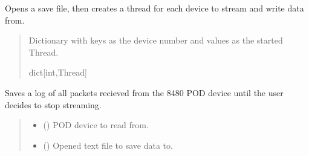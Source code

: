 \documentclass[letterpaper,10pt,english]{sphinxmanual}
\begin{document}
\begin{fulllineitems}
\begin{fulllineitems}
\label{\detokenize{Setup.SetupOneDevice:Setup.SetupOneDevice.Setup_8480SC.Setup8480SC._StreamThreading}}
\pysigstartsignatures
{}
\pysigstopsignatures
\sphinxAtStartPar
Opens a save file, then creates a thread for each device to stream and write         data from.
\begin{quote}\begin{description}
\sphinxAtStartPar
Dictionary with keys as the device number and values as the                 started Thread.

\sphinxAtStartPar
dict{[}int,Thread{]}

\end{description}\end{quote}

\end{fulllineitems}


\begin{fulllineitems}
\label{\detokenize{Setup.SetupOneDevice:Setup.SetupOneDevice.Setup_8480SC.Setup8480SC._StreamUntilStop}}
\pysigstartsignatures
{}
\pysigstopsignatures
\sphinxAtStartPar
Saves a log of all packets recieved from the 8480 POD device until the user decides         to stop streaming.
\begin{quote}\begin{description}
\begin{itemize}
\item {} 
\sphinxAtStartPar
{} () \textendash{} POD device to read from.

\item {} 
\sphinxAtStartPar
{} () \textendash{} Opened text file to save data to.


\end{itemize}
\end{description}
\end{quote}
\end{fulllineitems}
\end{fulllineitems}
\end{document}
